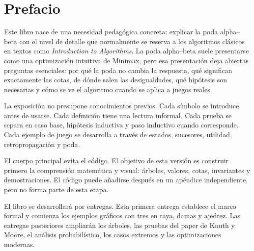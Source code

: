 \chapter*{Prefacio}

Este libro nace de una necesidad pedagógica concreta: explicar la poda alpha--beta con el nivel de detalle que normalmente se reserva a los algoritmos clásicos en textos como \emph{Introduction to Algorithms}. La poda alpha--beta suele presentarse como una optimización intuitiva de Minimax, pero esa presentación deja abiertas preguntas esenciales: por qué la poda no cambia la respuesta, qué significan exactamente las cotas, de dónde salen las desigualdades, qué hipótesis son necesarias y cómo se ve el algoritmo cuando se aplica a juegos reales.

La exposición no presupone conocimientos previos. Cada símbolo se introduce antes de usarse. Cada definición tiene una lectura informal. Cada prueba se separa en caso base, hipótesis inductiva y paso inductivo cuando corresponde. Cada ejemplo de juego se desarrolla a través de estados, sucesores, utilidad, retropropagación y poda.

\begin{summarybox}
El cuerpo principal evita el código. El objetivo de esta versión es construir primero la comprensión matemática y visual: árboles, valores, cotas, invariantes y demostraciones. El código puede añadirse después en un apéndice independiente, pero no forma parte de esta etapa.
\end{summarybox}

El libro se desarrollará por entregas. Esta primera entrega establece el marco formal y comienza los ejemplos gráficos con tres en raya, damas y ajedrez. Las entregas posteriores ampliarán los árboles, las pruebas del paper de Knuth y Moore, el análisis probabilístico, los casos extremos y las optimizaciones modernas.
